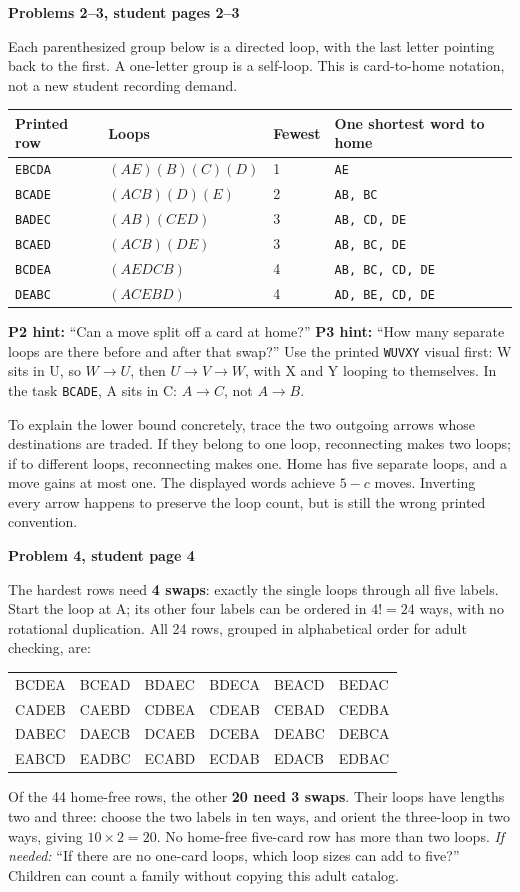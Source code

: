\documentclass[11pt]{article}
\newcommand{\sub}[1]{\par\textbf{#1}\par}
\newcommand{\row}[1]{\texttt{#1}}
\newcommand{\hint}[1]{\emph{If needed:} #1}
\begin{document}
\sub{Problems 2--3, student pages 2--3}
Each parenthesized group below is a directed loop, with the last letter pointing back to the first. A one-letter group is a self-loop. This is card-to-home notation, not a new student recording demand.
\begin{center}\small\renewcommand{\arraystretch}{1.2}
\begin{tabular}{llll}
Printed row & Loops & Fewest & One shortest word to home\\\midrule
\row{EBCDA}&$(AE)(B)(C)(D)$&1&\row{AE}\\
\row{BCADE}&$(ACB)(D)(E)$&2&\row{AB, BC}\\
\row{BADEC}&$(AB)(CED)$&3&\row{AB, CD, DE}\\
\row{BCAED}&$(ACB)(DE)$&3&\row{AB, BC, DE}\\
\row{BCDEA}&$(AEDCB)$&4&\row{AB, BC, CD, DE}\\
\row{DEABC}&$(ACEBD)$&4&\row{AD, BE, CD, DE}
\end{tabular}
\end{center}
\textbf{P2 hint:} ``Can a move split off a card at home?'' \textbf{P3 hint:} ``How many separate loops are there before and after that swap?'' Use the printed \row{WUVXY} visual first: W sits in U, so $W\to U$, then $U\to V\to W$, with X and Y looping to themselves. In the task \row{BCADE}, A sits in C: $A\to C$, not $A\to B$.

To explain the lower bound concretely, trace the two outgoing arrows whose destinations are traded. If they belong to one loop, reconnecting makes two loops; if to different loops, reconnecting makes one. Home has five separate loops, and a move gains at most one. The displayed words achieve $5-c$ moves. Inverting every arrow happens to preserve the loop count, but is still the wrong printed convention.

\sub{Problem 4, student page 4}
The hardest rows need \textbf{4 swaps}: exactly the single loops through all five labels. Start the loop at A; its other four labels can be ordered in $4!=24$ ways, with no rotational duplication. All 24 rows, grouped in alphabetical order for adult checking, are:
\begin{center}\ttfamily\small
\begin{tabular}{llllll}
BCDEA&BCEAD&BDAEC&BDECA&BEACD&BEDAC\\
CADEB&CAEBD&CDBEA&CDEAB&CEBAD&CEDBA\\
DABEC&DAECB&DCAEB&DCEBA&DEABC&DEBCA\\
EABCD&EADBC&ECABD&ECDAB&EDACB&EDBAC
\end{tabular}
\end{center}
Of the 44 home-free rows, the other \textbf{20 need 3 swaps}. Their loops have lengths two and three: choose the two labels in ten ways, and orient the three-loop in two ways, giving $10\times2=20$. No home-free five-card row has more than two loops. \hint{``If there are no one-card loops, which loop sizes can add to five?''} Children can count a family without copying this adult catalog.
\end{document}
